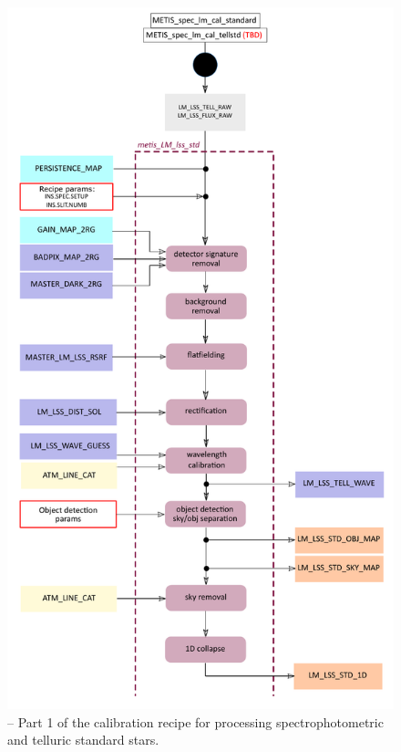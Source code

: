 \begin{figure}[ht]
  \centering
  \includegraphics[width=0.4\textheight]{figures/metis_lm_lss_std_v0.8_part_1.pdf}
  \caption[Recipe: ]{ --
    Part 1 of the calibration recipe for processing spectrophotometric and telluric standard stars.}
  \label{Fig:rec_lm_lss_flux1}
\end{figure}
